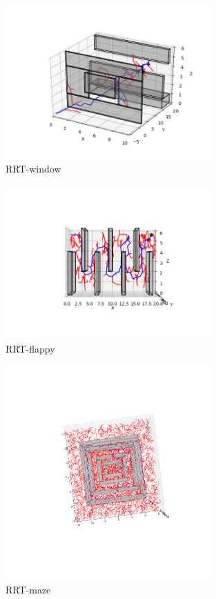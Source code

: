 \documentclass{article} %
\begin{document}
\begin{figure}[H]
	\centering
    \includegraphics[width=0.7\textwidth]{./images/RRT-window.png}
    \caption{RRT-window}
    \label{RRT-window}
\end{figure}

\begin{figure}[H]
	\centering
    \includegraphics[width=0.7\textwidth]{./images/RRT-flappybird.png}
    \caption{RRT-flappy}
    \label{RRT-flappy}
\end{figure}

\begin{figure}[H]
	\centering
    \includegraphics[width=0.7\textwidth]{./images/RRT-maze.png}
    \caption{RRT-maze}
    \label{RRT-maze}
\end{figure}
\end{document}
